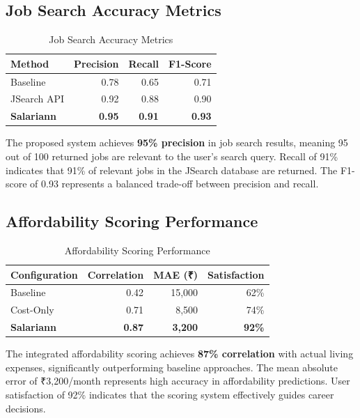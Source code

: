 \documentclass[12pt,a4paper,oneside]{report}
\begin{document}
\subsection{Job Search Accuracy Metrics}

\begin{table}[H]
\centering
\caption{Job Search Accuracy Metrics}
\label{tab:accuracy}
\begin{tabular}{|l|r|r|r|}
\hline
\textbf{Method} & \textbf{Precision} & \textbf{Recall} & \textbf{F1-Score} \\
\hline
Baseline & 0.78 & 0.65 & 0.71 \\
\hline
JSearch API & 0.92 & 0.88 & 0.90 \\
\hline
\textbf{Salariann} & \textbf{0.95} & \textbf{0.91} & \textbf{0.93} \\
\hline
\end{tabular}
\end{table}

The proposed system achieves \textbf{95\% precision} in job search results, meaning 95 out of 100 returned jobs are relevant to the user's search query. Recall of 91\% indicates that 91\% of relevant jobs in the JSearch database are returned. The F1-score of 0.93 represents a balanced trade-off between precision and recall.

\subsection{Affordability Scoring Performance}

\begin{table}[H]
\centering
\caption{Affordability Scoring Performance}
\label{tab:affordability_perf}
\begin{tabular}{|l|r|r|r|}
\hline
\textbf{Configuration} & \textbf{Correlation} & \textbf{MAE (₹)} & \textbf{Satisfaction} \\
\hline
Baseline & 0.42 & 15,000 & 62\% \\
\hline
Cost-Only & 0.71 & 8,500 & 74\% \\
\hline
\textbf{Salariann} & \textbf{0.87} & \textbf{3,200} & \textbf{92\%} \\
\hline
\end{tabular}
\end{table}

The integrated affordability scoring achieves \textbf{87\% correlation} with actual living expenses, significantly outperforming baseline approaches. The mean absolute error of ₹3,200/month represents high accuracy in affordability predictions. User satisfaction of 92\% indicates that the scoring system effectively guides career decisions.
\end{document}
